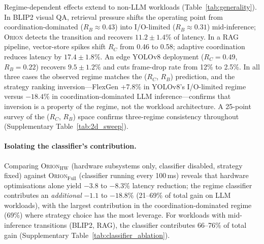 Regime-dependent effects extend to non-LLM workloads (Table~\ref{tab:generality}).
In BLIP2 visual QA, retrieval pressure shifts the operating point from
coordination-dominated ($R_B \approx 0.43$) into I/O-limited ($R_B \approx 0.31$)
mid-inference; \textsc{Orion} detects the transition and recovers $11.2 \pm 1.4\%$
of latency.
In a RAG pipeline, vector-store spikes shift $R_C$ from 0.46 to 0.58;
adaptive coordination reduces latency by $17.4 \pm 1.8\%$.
An edge YOLOv8 deployment ($R_C\!=\!0.49$, $R_B\!=\!0.22$) recovers $9.5 \pm 1.2\%$
and cuts frame-drop rate from 12\% to 2.5\%.
In all three cases the observed regime matches the ($R_C$, $R_B$) prediction,
and the strategy ranking inversion---FlexGen +7.8\% in YOLOv8's I/O-limited
regime versus $-18.4\%$ in coordination-dominated LLM inference---confirms that
inversion is a property of the regime, not the workload architecture.
A 25-point survey of the ($R_C$, $R_B$) space confirms three-regime consistency
throughout (Supplementary Table~\ref{tab:2d_sweep}).

\paragraph{Isolating the classifier's contribution.}
Comparing \textsc{Orion}$_{\mathrm{HW}}$ (hardware subsystems only, classifier
disabled, strategy fixed) against \textsc{Orion}$_{\mathrm{Full}}$ (classifier
running every 100\,ms) reveals that hardware optimisations alone yield
$-3.8$ to $-8.3\%$ latency reduction; the regime classifier contributes
an \emph{additional} $-1.1$ to $-18.8\%$ (21--69\% of total gain on LLM
workloads), with the largest contribution in the coordination-dominated
regime (69\%) where strategy choice has the most leverage.
For workloads with mid-inference transitions (BLIP2, RAG), the classifier
contributes 66--76\% of total gain
(Supplementary Table~\ref{tab:classifier_ablation}).

